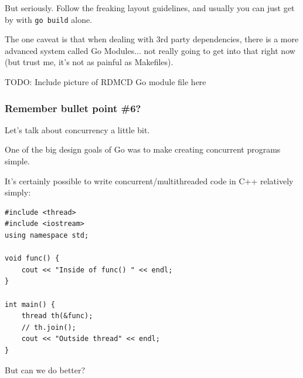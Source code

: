\documentclass{beamer}
\begin{document}
\begin{frame}

But seriously. Follow the freaking layout guidelines, and usually you can just get by with \texttt{go build} alone.

The one caveat is that when dealing with 3rd party dependencies, there is a more advanced system called Go Modules... not really going to get into that right now (but trust me, it's not as painful as Makefiles).

TODO: Include picture of RDMCD Go module file here

\end{frame}

\begin{frame}[fragile]
\frametitle{Remember bullet point \#6?}

Let's talk about concurrency a little bit. 

One of the big design goals of Go was to make creating concurrent programs simple. 

It's certainly possible to write concurrent/multithreaded code in C++ relatively simply:

\begin{lstlisting}
#include <thread>
#include <iostream>
using namespace std;

void func() {
	cout << "Inside of func() " << endl;
}

int main() {
	thread th(&func);
	// th.join();
	cout << "Outside thread" << endl;
}
\end{lstlisting}

But can we do better?

\end{frame}
\end{document}
